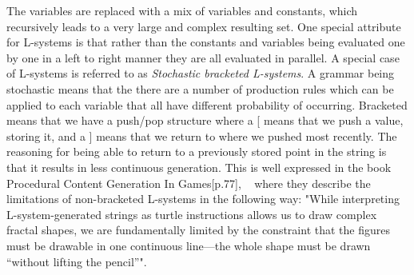 The variables are replaced with a mix of variables and constants, which recursively leads to a very large and complex resulting set.
One special attribute  for L-systems is that rather than the constants and variables being evaluated one by one in a left to right manner they are all evaluated in parallel.
A special case of L-systems is referred to as \textit{Stochastic bracketed L-systems}.
A grammar being stochastic means that the there are a number of production rules which can be applied to each variable that all have different probability of occurring.
Bracketed means that we have a push/pop structure where a [ means that we push a value, storing it, and a ] means that we return to where we pushed most recently.
The reasoning for being able to return to a previously stored point in the string is that it results in less continuous generation.
This is well expressed in the book Procedural Content Generation In Games[p.77], ~\cite{PCG_in_games} where they describe the limitations of non-bracketed L-systems in the following way:
"While interpreting L-system-generated strings as turtle instructions allows us to draw complex fractal shapes, we are fundamentally limited by the constraint that the figures must be drawable in one continuous line—the whole shape must be drawn “without lifting the pencil”".
